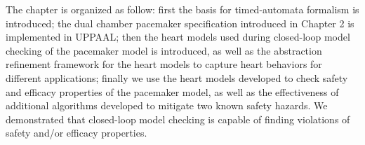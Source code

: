 The chapter is organized as follow: first the basis for timed-automata formalism is introduced; the dual chamber pacemaker specification introduced in Chapter 2 is implemented in UPPAAL; then the heart models used during closed-loop model checking of the pacemaker model is introduced, as well as the abstraction refinement framework for the heart models to capture heart behaviors for different applications; finally we use the heart models developed to check safety and efficacy properties of the pacemaker model, as well as the effectiveness of additional algorithms developed to mitigate two known safety hazards. We demonstrated that closed-loop model checking is capable of finding violations of safety and/or efficacy properties.





